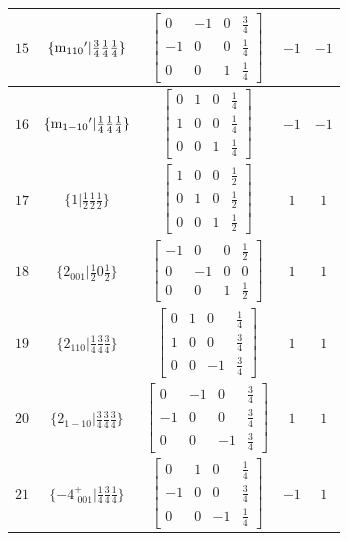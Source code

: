 \documentclass[fleqn,8pt]{jsarticle}
\begin{document}
\begin{longtable}{ccccc}
$ 15 $ & $ \{{\rm m}_{110}{}'|\frac{3}{4} \frac{1}{4} \frac{1}{4}\} $ & $ \begin{bmatrix} 0 & -1 & 0 & \frac{3}{4} \\ -1 & 0 & 0 & \frac{1}{4} \\ 0 & 0 & 1 & \frac{1}{4} \end{bmatrix} $ & $ -1 $ & $ -1 $ \\ \hline
$ 16 $ & $ \{{\rm m}_{1-10}{}'|\frac{1}{4} \frac{1}{4} \frac{1}{4}\} $ & $ \begin{bmatrix} 0 & 1 & 0 & \frac{1}{4} \\ 1 & 0 & 0 & \frac{1}{4} \\ 0 & 0 & 1 & \frac{1}{4} \end{bmatrix} $ & $ -1 $ & $ -1 $ \\ \hline
$ 17 $ & $ \{1|\frac{1}{2} \frac{1}{2} \frac{1}{2}\} $ & $ \begin{bmatrix} 1 & 0 & 0 & \frac{1}{2} \\ 0 & 1 & 0 & \frac{1}{2} \\ 0 & 0 & 1 & \frac{1}{2} \end{bmatrix} $ & $ 1 $ & $ 1 $ \\ \hline
$ 18 $ & $ \{2{}_{001}|\frac{1}{2} 0 \frac{1}{2}\} $ & $ \begin{bmatrix} -1 & 0 & 0 & \frac{1}{2} \\ 0 & -1 & 0 & 0 \\ 0 & 0 & 1 & \frac{1}{2} \end{bmatrix} $ & $ 1 $ & $ 1 $ \\ \hline
$ 19 $ & $ \{2{}_{110}|\frac{1}{4} \frac{3}{4} \frac{3}{4}\} $ & $ \begin{bmatrix} 0 & 1 & 0 & \frac{1}{4} \\ 1 & 0 & 0 & \frac{3}{4} \\ 0 & 0 & -1 & \frac{3}{4} \end{bmatrix} $ & $ 1 $ & $ 1 $ \\ \hline
$ 20 $ & $ \{2{}_{1-10}|\frac{3}{4} \frac{3}{4} \frac{3}{4}\} $ & $ \begin{bmatrix} 0 & -1 & 0 & \frac{3}{4} \\ -1 & 0 & 0 & \frac{3}{4} \\ 0 & 0 & -1 & \frac{3}{4} \end{bmatrix} $ & $ 1 $ & $ 1 $ \\ \hline
$ 21 $ & $ \{-4^{+}_{\,\,001}|\frac{1}{4} \frac{3}{4} \frac{1}{4}\} $ & $ \begin{bmatrix} 0 & 1 & 0 & \frac{1}{4} \\ -1 & 0 & 0 & \frac{3}{4} \\ 0 & 0 & -1 & \frac{1}{4} \end{bmatrix} $ & $ -1 $ & $ 1 $ \\ \hline

\end{longtable}
\end{document}
